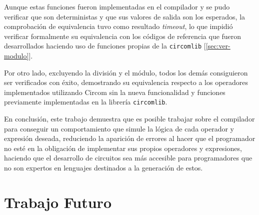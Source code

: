 \documentclass[a4paper,12pt]{report}
\begin{document}
	\vspace{0.2cm}
	\noindent Aunque estas funciones fueron implementadas en el compilador y se pudo verificar que son deterministas y que sus valores de salida son los esperados, la comprobación de equivalencia tuvo como resultado \textit{timeout}, lo que impidió verificar formalmente su equivalencia con los códigos de referencia que fueron desarrollados haciendo uso de funciones propias de la \texttt{circomlib} [\ref{sec:ver-modulo}].
	
	\vspace{0.2cm}
	\noindent Por otro lado, excluyendo la división y el módulo, todos los demás consiguieron ser verificados con éxito, demostrando su equivalencia respecto a los operadores implementados utilizando Circom sin la nueva funcionalidad y funciones previamente implementadas en la librería \texttt{circomlib}.
	
	\vspace{0.2cm}
	
	\noindent En conclusión, este trabajo demuestra que es posible trabajar sobre el compilador para conseguir un comportamiento que simule la lógica de cada operador y expresión deseada, reduciendo la aparición de errores al hacer que el programador no esté en la obligación de implementar sus propios operadores y expresiones, haciendo que el desarrollo de circuitos sea más accesible para programadores que no son expertos en lenguajes destinados a la generación de estos.
	
	\section{Trabajo Futuro}
	
\end{document}
